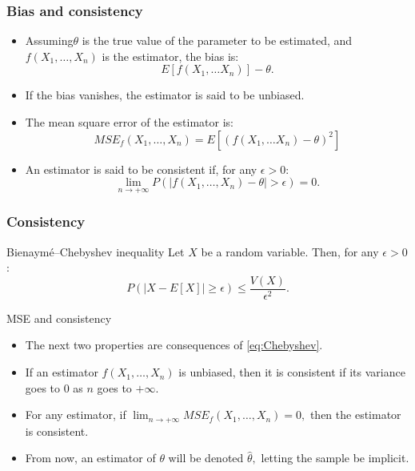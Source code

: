 \documentclass[main.tex]{subfiles}
\begin{document}
\begin{frame}
    \frametitle{Bias and consistency}
\begin{itemize}
\item<+-> Assuming$\theta$ is the true value of the parameter to be estimated,
and $f\left( X_1, \dots, X_n \right)$ is the estimator, the bias is:
\begin{equation}
    E\left[ f\left( X_1,\dots X_n \right) \right] - \theta.
\end{equation}
\item<+-> If the bias vanishes, the estimator is said to be unbiased.
\item<+-> The mean square error of the estimator is:
\begin{equation}
    MSE_f(X_1,\dots, X_n)= E\left[ \left( f(X_1, \dots X_n) - \theta \right)^2 \right]
\end{equation}
\item<+-> An estimator is said to be consistent if, for any $\epsilon > 0$:
\begin{equation}
    \lim_{n \to +\infty}P\left( \lvert f(X_1,\dots,X_n) - \theta\rvert > \epsilon \right) = 0.
\end{equation} 
\end{itemize}
\end{frame}
\begin{frame}
    \frametitle{Consistency}
    \begin{block}{Bienaymé–Chebyshev inequality}
        Let $X$ be a random variable. Then, for any
        $\epsilon > 0$:
        \begin{equation}
            \label{eq:Chebyshev}
            P\left( \lvert X- E\left[ X \right] \rvert \geq \epsilon \right) \leq \frac{V(X)}{\epsilon^2}.
        \end{equation}
    \end{block}
    \begin{block}{MSE and consistency}
        \begin{itemize}
            \item<+-> The next two properties are consequences of \ref{eq:Chebyshev}.
            \item<+-> If an estimator $f\left( X_1, \dots, X_n \right)$ is unbiased, then it is consistent
    if its variance goes to 0 as $n$ goes to $+\infty$.
            \item<+-> For any estimator, if $\lim_{n \to +\infty} MSE_f\left( X_1,\dots,X_n \right) = 0,$ then
            the estimator is consistent.
            \item<+-> From now, an estimator of $\theta$ will be denoted $\hat{\theta},$ letting the sample be implicit.
        \end{itemize}
    \end{block}
\end{frame}
\end{document}
